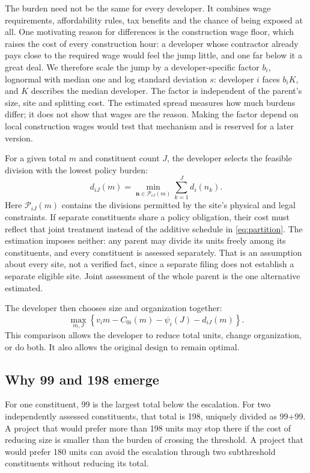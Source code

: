 \documentclass[11pt]{article}
\begin{document}
The burden need not be the same for every developer. It combines wage requirements, affordability rules, tax benefits and the chance of being exposed at all. One motivating reason for differences is the construction wage floor, which raises the cost of every construction hour: a developer whose contractor already pays close to the required wage would feel the jump little, and one far below it a great deal. We therefore scale the jump by a developer-specific factor $b_i$, lognormal with median one and log standard deviation $s$: developer $i$ faces $b_iK$, and $K$ describes the median developer. The factor is independent of the parent's size, site and splitting cost. The estimated spread measures how much burdens differ; it does not show that wages are the reason. Making the factor depend on local construction wages would test that mechanism and is reserved for a later version.

For a given total $m$ and constituent count $J$, the developer selects the feasible division with the lowest policy burden:
\begin{equation}
d_{iJ}(m)=\min_{\mathbf n\in\mathcal P_{iJ}(m)}\sum_{k=1}^{J}d_i(n_k).
\label{eq:partition}
\end{equation}
Here $\mathcal P_{iJ}(m)$ contains the divisions permitted by the site's physical and legal constraints. If separate constituents share a policy obligation, their cost must reflect that joint treatment instead of the additive schedule in \eqref{eq:partition}. The estimation imposes neither: any parent may divide its units freely among its constituents, and every constituent is assessed separately. That is an assumption about every site, not a verified fact, since a separate filing does not establish a separate eligible site. Joint assessment of the whole parent is the one alternative estimated.

The developer then chooses size and organization together:
\begin{equation}
\max_{m,J}\left\{v_i m-C_{0i}(m)-\psi_i(J)-d_{iJ}(m)\right\}.
\label{eq:choice}
\end{equation}
This comparison allows the developer to reduce total units, change organization, or do both. It also allows the original design to remain optimal.

\subsection{Why 99 and 198 emerge}

For one constituent, 99 is the largest total below the escalation. For two independently assessed constituents, that total is 198, uniquely divided as 99+99. A project that would prefer more than 198 units may stop there if the cost of reducing size is smaller than the burden of crossing the threshold. A project that would prefer 180 units can avoid the escalation through two subthreshold constituents without reducing its total.
\end{document}
